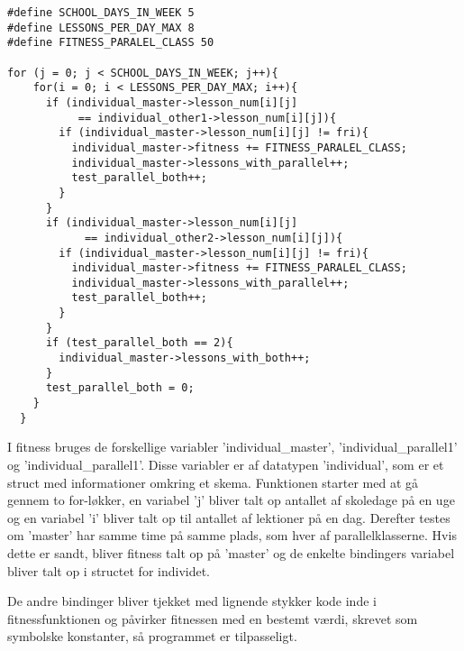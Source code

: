 \begin{lstlisting}
#define SCHOOL_DAYS_IN_WEEK 5
#define LESSONS_PER_DAY_MAX 8
#define FITNESS_PARALEL_CLASS 50

for (j = 0; j < SCHOOL_DAYS_IN_WEEK; j++){
    for(i = 0; i < LESSONS_PER_DAY_MAX; i++){
      if (individual_master->lesson_num[i][j]
           == individual_other1->lesson_num[i][j]){
        if (individual_master->lesson_num[i][j] != fri){
          individual_master->fitness += FITNESS_PARALEL_CLASS;
          individual_master->lessons_with_parallel++;
          test_parallel_both++;
        }
      }
      if (individual_master->lesson_num[i][j] 
            == individual_other2->lesson_num[i][j]){
        if (individual_master->lesson_num[i][j] != fri){
          individual_master->fitness += FITNESS_PARALEL_CLASS;
          individual_master->lessons_with_parallel++;
          test_parallel_both++;
        }
      }
      if (test_parallel_both == 2){
        individual_master->lessons_with_both++;
      }
      test_parallel_both = 0;
    }
  }
\end{lstlisting}

I fitness bruges de forskellige variabler ’individual\_master’, ’individual\_parallel1’ og ’individual\_parallel1’. Disse variabler er af datatypen ’individual’, som er et struct med informationer omkring et skema.
Funktionen starter med at gå gennem to for-løkker, en variabel ’j’ bliver talt op antallet af skoledage på en uge og en variabel ’i’ bliver talt op til antallet af lektioner på en dag. Derefter testes om ’master’ har samme time på samme plads, som hver af parallelklasserne. Hvis dette er sandt, bliver fitness talt op på ’master’ og de enkelte bindingers variabel bliver talt op i structet for individet.

De andre bindinger bliver tjekket med lignende stykker kode inde i fitnessfunktionen og påvirker fitnessen med en bestemt værdi, skrevet som symbolske konstanter, så programmet er tilpasseligt.
